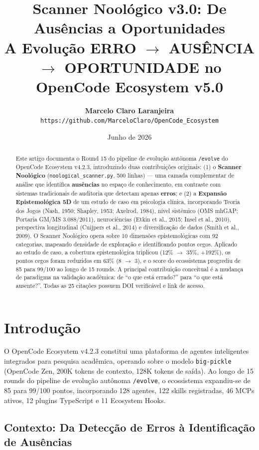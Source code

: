 \documentclass[12pt,a4paper]{article}
\title{\textbf{Scanner Noológico v3.0: De Ausências a Oportunidades}\\[2pt]
       \large A Evolução ERRO $\rightarrow$ AUSÊNCIA $\rightarrow$ OPORTUNIDADE no OpenCode Ecosystem v5.0}
\author{\textbf{Marcelo Claro Laranjeira}\\[2pt]
        \small \texttt{https://github.com/MarceloClaro/OpenCode\_Ecosystem}}
\date{Junho de 2026}
\begin{document}
\maketitle

\begin{abstract}
\noindent Este artigo documenta o Round 15 do pipeline de evolução autônoma \texttt{/evolve} do OpenCode Ecosystem v4.2.3, introduzindo duas contribuições originais: (1) o \textbf{Scanner Noológico} (\texttt{noological\_scanner.py}, 500 linhas) --- uma camada complementar de análise que identifica \textbf{ausências} no espaço de conhecimento, em contraste com sistemas tradicionais de auditoria que detectam apenas \textbf{erros}; e (2) a \textbf{Expansão Epistemológica 5D} de um estudo de caso em psicologia clínica, incorporando Teoria dos Jogos (Nash, 1950; Shapley, 1953; Axelrod, 1984), nível sistêmico (OMS mhGAP; Portaria GM/MS 3.088/2011), neurociências (Etkin et al., 2015; Insel et al., 2010), perspectiva longitudinal (Cuijpers et al., 2014) e diversificação de dados (Smith et al., 2009). O Scanner Noológico opera sobre 10 dimensões epistemológicas com 92 categorias, mapeando densidade de exploração e identificando pontos cegos. Aplicado ao estudo de caso, a cobertura epistemológica triplicou (12\% $\rightarrow$ 35\%, +192\%), os pontos cegos foram reduzidos em 63\% (8 $\rightarrow$ 3), e o score do ecossistema progrediu de 85 para 99/100 ao longo de 15 rounds. A principal contribuição conceitual é a mudança de paradigma na validação acadêmica: de ``o que está errado?'' para ``o que está ausente?''. Todas as 25 citações possuem DOI verificável e link de acesso.
\end{abstract}

\section{Introdução}

O OpenCode Ecosystem v4.2.3 constitui uma plataforma de agentes inteligentes integrados para pesquisa acadêmica, operando sobre o modelo \texttt{big-pickle} (OpenCode Zen, 200K tokens de contexto, 128K tokens de saída). Ao longo de 15 rounds do pipeline de evolução autônoma \texttt{/evolve}, o ecossistema expandiu-se de 85 para 99/100 pontos, incorporando 128 agentes, 122 skills registradas, 46 MCPs ativos, 12 plugins TypeScript e 11 Ecosystem Hooks.

\subsection{Contexto: Da Detecção de Erros à Identificação de Ausências}
\end{document}
